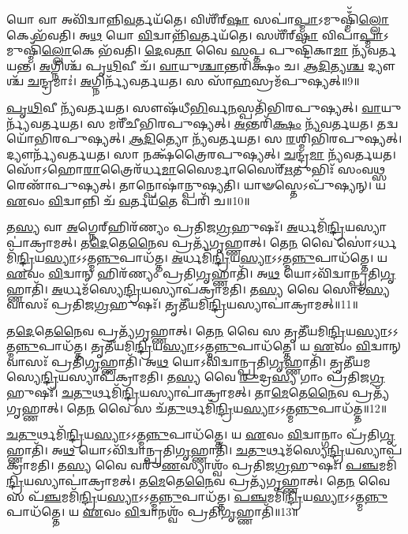 𑌯𑍋 𑌵𑌾 𑌅𑌵𑌿᳴𑌦𑍍𑌵𑌾𑌨𑍍𑌨𑌿\-\ul{𑌵}\-𑌰𑍍𑌤𑌯᳴𑌤𑍇।
𑌵𑌿𑌶𑍀᳴𑌰𑍍‌\mbox{}\-\ul{𑌷𑌾} 𑌸𑌪𑌾॑\-\ul{𑌪𑍍𑌮𑌾}\-\-𑌽𑌮𑍁𑌷𑍍𑌮𑌿𑌁᳴\-\ul{𑌲𑍍𑌲𑍋}\-𑌕𑍇 𑌭᳴𑌵𑌤𑌿।
𑌅\-\ul{𑌥} 𑌯𑍋 \ul{𑌵𑌿}\-𑌦𑍍𑌵𑌾𑌨𑍍𑌨𑌿᳴\-\ul{𑌵}\-𑌰𑍍𑌤𑌯᳴𑌤𑍇।
𑌸𑌶𑍀᳴𑌰𑍍‌\mbox{}\-\ul{𑌷𑌾} 𑌵𑌿𑌪𑌾॑\-\ul{𑌪𑍍𑌮𑌾}\-\-𑌽𑌮𑍁𑌷𑍍𑌮𑌿𑌁᳴\-\ul{𑌲𑍍𑌲𑍋}\-𑌕𑍇 𑌭᳴𑌵𑌤𑌿।
\-\ul{𑌦𑍇}\-𑌵\-\ul{𑌤𑌾} 𑌵𑍈 \ul{𑌸}\-𑌪𑍍𑌤 𑌪𑍁𑌷𑍍𑌟𑌿᳴𑌕𑌾\-\ul{𑌮𑌾} 𑌨𑍍𑌯᳴𑌵𑌰𑍍𑌤𑌯𑌨𑍍𑌤।
\-\ul{𑌅}\-𑌗𑍍𑌨𑌿𑌶𑍍𑌚᳴ 𑌪𑍃\-\ul{𑌥𑌿}\-𑌵𑍀 𑌚᳴।
\-\ul{𑌵𑌾}\-𑌯𑍁\-\ul{𑌶𑍍𑌚𑌾}\-𑌨𑍍𑌤𑌰𑌿᳴𑌕𑍍𑌷𑌂 𑌚।
\-\ul{𑌆}\-\-\ul{𑌦𑌿}\-𑌤𑍍𑌯\-\ul{𑌶𑍍𑌚} 𑌦𑍍𑌯𑍗𑌶𑍍𑌚᳴ \ul{𑌚}\-𑌨𑍍𑌦𑍍𑌰𑌮𑌾𑌃॑।
\-\ul{𑌅}\-𑌗𑍍𑌨𑌿𑌰𑍍𑌨𑍍𑌯᳴𑌵𑌰𑍍𑌤𑌯𑌤।
𑌸 𑌸𑌾᳴\-\ul{𑌹}\-𑌸𑍍𑌰𑌮᳴𑌪𑍁𑌷𑍍𑌯𑌤𑍍॥9॥

\-\ul{𑌪𑍃}\-\-\ul{𑌥𑌿}\-𑌵𑍀 𑌨𑍍𑌯᳴𑌵𑌰𑍍𑌤𑌯𑌤।
𑌸𑍗𑌷᳴𑌧𑍀\-\ul{𑌭𑌿}\-𑌰𑍍𑌵\-\ul{𑌨}\-𑌸𑍍𑌪𑌤𑌿᳴𑌭𑌿𑌰𑌪𑍁𑌷𑍍𑌯𑌤𑍍।
\-\ul{𑌵𑌾}\-𑌯𑍁𑌰𑍍𑌨𑍍𑌯᳴\-𑌵𑌰𑍍𑌤𑌯𑌤।
𑌸 𑌮𑌰𑍀᳴𑌚𑍀𑌭𑌿𑌰𑌪𑍁𑌷𑍍𑌯𑌤𑍍।
\-\ul{𑌅}\-𑌨𑍍𑌤𑌰𑌿᳴\-\ul{𑌕𑍍𑌷𑌂} 𑌨𑍍𑌯᳴𑌵𑌰𑍍𑌤𑌯𑌤।
𑌤𑌦𑍍𑌵𑌯𑍋᳴𑌭𑌿𑌰\-𑌪𑍁𑌷𑍍𑌯𑌤𑍍।
\-\ul{𑌆}\-\-\ul{𑌦𑌿}\-𑌤𑍍𑌯𑍋 𑌨𑍍𑌯᳴𑌵𑌰𑍍𑌤𑌯𑌤।
𑌸 \ul{𑌰}\-𑌶𑍍𑌮𑌿𑌭𑌿᳴𑌰𑌪𑍁𑌷𑍍𑌯𑌤𑍍।
𑌦𑍍𑌯𑍗𑌰𑍍𑌨𑍍𑌯᳴\-𑌵𑌰𑍍𑌤𑌯𑌤।
𑌸𑌾 𑌨𑌕𑍍𑌷᳴𑌤𑍍𑌰𑍈𑌰𑌪𑍁𑌷𑍍𑌯𑌤𑍍।
\-\ul{𑌚}\-𑌨𑍍𑌦𑍍𑌰\-\ul{𑌮𑌾} 𑌨𑍍𑌯᳴𑌵𑌰𑍍𑌤𑌯𑌤।
𑌸𑍋᳴𑌽𑌹𑍋\-\ul{𑌰𑌾}\-𑌤𑍍𑌰𑍈𑌰᳴𑌰𑍍𑌧\-\-\ul{𑌮𑌾}\-𑌸𑍈𑌰𑍍𑌮𑌾𑌸𑍈𑌰𑍍᳴\-\ul{𑌋}\-𑌤𑍁𑌭𑌿𑌃᳴ 𑌸𑌂𑌵\-\ul{𑌥𑍍𑌸}\-𑌰𑍇𑌣𑌾᳴𑌪𑍁𑌷𑍍𑌯𑌤𑍍।
𑌤𑌾𑌨𑍍𑌪𑍋𑌷𑌾॑𑌨𑍍𑌪𑍁𑌷𑍍𑌯𑌤𑌿।
𑌯𑌾𑍟𑌸𑍍𑌤𑍇\-𑌽𑌪𑍁᳴𑌷𑍍𑌯𑌨𑍍।
𑌯 \ul{𑌏}\-𑌵𑌂 \ul{𑌵𑌿}\-𑌦𑍍𑌵𑌾𑌨𑍍𑌨𑌿 𑌚᳴ \ul{𑌵}\-𑌰𑍍𑌤𑌯᳴\-\ul{𑌤𑍇} 𑌪𑌰𑌿᳴ 𑌚॥10॥\anuvakamend[\-\ul{𑌅}\-\-\ul{𑌪𑍁}\-\-\ul{𑌷𑍍𑌯}\-𑌨𑍍𑌨𑌕𑍍𑌷᳴𑌤𑍍𑌰𑍈𑌰𑌪𑍁\-\ul{𑌷𑍍𑌯}\-𑌤𑍍𑌪𑌞𑍍𑌚᳴ 𑌚]

𑌤\-\ul{𑌸𑍍𑌯} 𑌵𑌾 \ul{𑌅}\-𑌗𑍍𑌨𑍇𑌰𑍍‌\mbox{}𑌹𑌿𑌰᳴𑌣𑍍𑌯𑌂 𑌪𑍍𑌰𑌤𑌿𑌜\-\ul{𑌗𑍍𑌰}\-𑌹𑍁𑌷𑌃᳴।
\-\ul{𑌅}\-𑌰𑍍𑌧𑌮𑌿᳴\-\ul{𑌨𑍍𑌦𑍍𑌰𑌿}\-𑌯\-𑌸𑍍𑌯𑌾𑌪𑌾॑\-𑌕𑍍𑌰𑌾𑌮𑌤𑍍।
𑌤\-\ul{𑌦𑍇}\-𑌤𑍇\-\ul{𑌨𑍈}\-𑌵 𑌪𑍍𑌰𑌤𑍍𑌯᳴𑌗𑍃𑌹𑍍𑌣𑌾𑌤𑍍।
𑌤𑍇\-\ul{𑌨} 𑌵𑍈 𑌸𑍋॑\-𑌽𑌰𑍍𑌧𑌮𑌿᳴\-\ul{𑌨𑍍𑌦𑍍𑌰𑌿}\-𑌯\-\-\ul{𑌸𑍍𑌯𑌾}\-\-𑌽𑌽𑌤𑍍𑌮\-\ul{𑌨𑍍𑌨𑍁}\-𑌪𑌾\-𑌧᳴𑌤𑍍𑌤।
\-\ul{𑌅}\-𑌰𑍍𑌧𑌮𑌿᳴\-\ul{𑌨𑍍𑌦𑍍𑌰𑌿}\-𑌯\-\-\ul{𑌸𑍍𑌯𑌾}\-\-𑌽𑌽𑌤𑍍𑌮\-\ul{𑌨𑍍𑌨𑍁}\-𑌪𑌾\-𑌧᳴𑌤𑍍𑌤𑍇।
𑌯 \ul{𑌏}\-𑌵𑌂 \ul{𑌵𑌿}\-𑌦𑍍𑌵𑌾𑌨𑍍 𑌹𑌿𑌰᳴𑌣𑍍𑌯𑌂 𑌪𑍍𑌰𑌤𑌿\-\ul{𑌗𑍃}\-𑌹𑍍𑌣𑌾𑌤𑌿᳴।
𑌅\-\ul{𑌥} 𑌯𑍋𑌽𑌵𑌿᳴𑌦𑍍𑌵𑌾𑌨𑍍𑌪𑍍𑌰𑌤𑌿\-\-\ul{𑌗𑍃}\-𑌹𑍍𑌣𑌾𑌤𑌿᳴।
\-\ul{𑌅}\-𑌰𑍍𑌧𑌮᳴𑌸𑍍𑌯𑍇\-\ul{𑌨𑍍𑌦𑍍𑌰𑌿}\-𑌯\-𑌸𑍍𑌯𑌾𑌪᳴\-𑌕𑍍𑌰𑌾𑌮𑌤𑌿।
𑌤\-\ul{𑌸𑍍𑌯} 𑌵𑍈 𑌸𑍋𑌮᳴\-\ul{𑌸𑍍𑌯} 𑌵𑌾𑌸𑌃᳴ 𑌪𑍍𑌰𑌤𑌿𑌜\-\ul{𑌗𑍍𑌰}\-𑌹𑍁𑌷𑌃᳴।
𑌤𑍃𑌤𑍀᳴𑌯𑌮𑌿\-\ul{𑌨𑍍𑌦𑍍𑌰𑌿}\-𑌯\-𑌸𑍍𑌯𑌾𑌪𑌾॑𑌕𑍍𑌰𑌾𑌮𑌤𑍍॥11॥

𑌤\-\ul{𑌦𑍇}\-𑌤𑍇\-\ul{𑌨𑍈}\-𑌵 𑌪𑍍𑌰𑌤𑍍𑌯᳴𑌗𑍃𑌹𑍍𑌣𑌾𑌤𑍍।
𑌤𑍇\-\ul{𑌨} 𑌵𑍈 𑌸 𑌤𑍃𑌤𑍀᳴𑌯𑌮𑌿\-\ul{𑌨𑍍𑌦𑍍𑌰𑌿}\-𑌯\-\-\ul{𑌸𑍍𑌯𑌾}\-\-𑌽𑌽𑌤𑍍𑌮\-\ul{𑌨𑍍𑌨𑍁}\-𑌪𑌾\-𑌧᳴𑌤𑍍𑌤।
𑌤𑍃𑌤𑍀᳴𑌯𑌮𑌿\-\ul{𑌨𑍍𑌦𑍍𑌰𑌿}\-𑌯\-\-\ul{𑌸𑍍𑌯𑌾}\-\-𑌽𑌽𑌤𑍍𑌮\-\ul{𑌨𑍍𑌨𑍁}\-𑌪𑌾\-𑌧᳴𑌤𑍍𑌤𑍇।
𑌯 \ul{𑌏}\-𑌵𑌂 \ul{𑌵𑌿}\-𑌦𑍍𑌵𑌾𑌨𑍍 𑌵𑌾𑌸𑌃᳴ 𑌪𑍍𑌰𑌤𑌿\-\ul{𑌗𑍃}\-𑌹𑍍𑌣𑌾𑌤𑌿᳴।
𑌅\-\ul{𑌥} 𑌯𑍋𑌽𑌵𑌿᳴𑌦𑍍𑌵𑌾𑌨𑍍𑌪𑍍𑌰𑌤𑌿\-\-\ul{𑌗𑍃}\-𑌹𑍍𑌣𑌾𑌤𑌿᳴।
𑌤𑍃𑌤𑍀᳴𑌯𑌮𑌸𑍍𑌯𑍇\-\ul{𑌨𑍍𑌦𑍍𑌰𑌿}\-𑌯\-𑌸𑍍𑌯𑌾𑌪᳴\-𑌕𑍍𑌰𑌾𑌮𑌤𑌿।
𑌤\-\ul{𑌸𑍍𑌯} 𑌵𑍈 \ul{𑌰𑍁}\-𑌦𑍍𑌰\-\ul{𑌸𑍍𑌯} 𑌗𑌾𑌂 𑌪𑍍𑌰᳴𑌤𑌿𑌜\-\ul{𑌗𑍍𑌰}\-𑌹𑍁𑌷𑌃᳴।
\-\ul{𑌚}\-\-\ul{𑌤𑍁}\-𑌰𑍍𑌥𑌮𑌿᳴\-\ul{𑌨𑍍𑌦𑍍𑌰𑌿}\-𑌯\-𑌸𑍍𑌯𑌾𑌪𑌾॑\-𑌕𑍍𑌰𑌾𑌮𑌤𑍍।
𑌤𑌾\-\ul{𑌮𑍇}\-𑌤𑍇\-\ul{𑌨𑍈}\-𑌵 𑌪𑍍𑌰𑌤𑍍𑌯᳴𑌗𑍃𑌹𑍍𑌣𑌾𑌤𑍍।
𑌤𑍇\-\ul{𑌨} 𑌵𑍈 𑌸 𑌚᳴\-\ul{𑌤𑍁}\-𑌰𑍍𑌥𑌮𑌿᳴\-\ul{𑌨𑍍𑌦𑍍𑌰𑌿}\-𑌯\-\-\ul{𑌸𑍍𑌯𑌾}\-\-𑌽𑌽𑌤𑍍𑌮\-\ul{𑌨𑍍𑌨𑍁}\-𑌪𑌾\-𑌧᳴𑌤𑍍𑌤॥12॥

\-\ul{𑌚}\-\-\ul{𑌤𑍁}\-𑌰𑍍𑌥𑌮𑌿᳴\-\ul{𑌨𑍍𑌦𑍍𑌰𑌿}\-𑌯\-\-\ul{𑌸𑍍𑌯𑌾}\-\-𑌽𑌽𑌤𑍍𑌮\-\ul{𑌨𑍍𑌨𑍁}\-𑌪𑌾\-𑌧᳴𑌤𑍍𑌤𑍇।
𑌯 \ul{𑌏}\-𑌵𑌂 \ul{𑌵𑌿}\-𑌦𑍍𑌵𑌾𑌨𑍍𑌗𑌾𑌂 𑌪𑍍𑌰᳴𑌤𑌿\-\ul{𑌗𑍃}\-𑌹𑍍𑌣𑌾𑌤𑌿᳴।
𑌅\-\ul{𑌥} 𑌯𑍋𑌽𑌵𑌿᳴𑌦𑍍𑌵𑌾𑌨𑍍𑌪𑍍𑌰𑌤𑌿\-\ul{𑌗𑍃}\-𑌹𑍍𑌣𑌾𑌤𑌿᳴।
\-\ul{𑌚}\-\-\ul{𑌤𑍁}\-𑌰𑍍𑌥𑌮᳴𑌸𑍍𑌯𑍇\-\ul{𑌨𑍍𑌦𑍍𑌰𑌿}\-𑌯\-𑌸𑍍𑌯𑌾𑌪᳴\-𑌕𑍍𑌰𑌾𑌮𑌤𑌿।
𑌤\-\ul{𑌸𑍍𑌯} 𑌵𑍈 𑌵𑌰𑍁᳴\-\ul{𑌣}\-𑌸𑍍𑌯𑌾𑌶𑍍𑌵𑌂᳴ 𑌪𑍍𑌰𑌤𑌿𑌜\-\ul{𑌗𑍍𑌰}\-𑌹𑍁𑌷𑌃᳴।
\-\ul{𑌪}\-\-\ul{𑌞𑍍𑌚}\-𑌮𑌮𑌿᳴\-\ul{𑌨𑍍𑌦𑍍𑌰𑌿}\-𑌯\-𑌸𑍍𑌯𑌾𑌪𑌾॑\-𑌕𑍍𑌰𑌾𑌮𑌤𑍍।
𑌤\-\ul{𑌮𑍇}\-𑌤𑍇\-\ul{𑌨𑍈}\-𑌵 𑌪𑍍𑌰𑌤𑍍𑌯᳴𑌗𑍃𑌹𑍍𑌣𑌾𑌤𑍍।
𑌤𑍇\-\ul{𑌨} 𑌵𑍈 𑌸 𑌪᳴\-\ul{𑌞𑍍𑌚}\-𑌮𑌮𑌿᳴\-\ul{𑌨𑍍𑌦𑍍𑌰𑌿}\-𑌯\-\-\ul{𑌸𑍍𑌯𑌾}\-\-𑌽𑌽𑌤𑍍𑌮\-\ul{𑌨𑍍𑌨𑍁}\-𑌪𑌾\-𑌧᳴𑌤𑍍𑌤।
\-\ul{𑌪}\-\-\ul{𑌞𑍍𑌚}\-𑌮𑌮𑌿᳴\-\ul{𑌨𑍍𑌦𑍍𑌰𑌿}\-𑌯\-\-\ul{𑌸𑍍𑌯𑌾}\-\-𑌽𑌽𑌤𑍍𑌮\-\ul{𑌨𑍍𑌨𑍁}\-𑌪𑌾\-𑌧᳴𑌤𑍍𑌤𑍇।
𑌯 \ul{𑌏}\-𑌵𑌂 \ul{𑌵𑌿}\-𑌦𑍍𑌵𑌾𑌨𑌶𑍍𑌵𑌂᳴ 𑌪𑍍𑌰𑌤𑌿\-\-\ul{𑌗𑍃}\-𑌹𑍍𑌣𑌾𑌤𑌿᳴॥13॥

